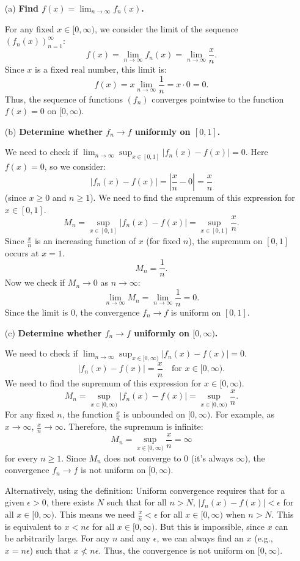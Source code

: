 \documentclass{article}
\begin{document}
\begin{enumerate}
  \item[(a)] \textbf{Find \(f(x) = \lim_{n\to\infty} f_n(x)\).}

    For any fixed \(x \in [0, \infty)\), we consider the limit of the sequence \((f_n(x))_{n=1}^\infty\):
    \[ f(x) = \lim_{n\to\infty} f_n(x) = \lim_{n\to\infty} \frac{x}{n}. \]
    Since \(x\) is a fixed real number, this limit is:
    \[ f(x) = x \lim_{n\to\infty} \frac{1}{n} = x \cdot 0 = 0. \]
    Thus, the sequence of functions \((f_n)\) converges pointwise to the function \(f(x) = 0\) on \([0, \infty)\).

  \item[(b)] \textbf{Determine whether \(f_n \to f\) uniformly on \([0, 1]\).}

    We need to check if \(\lim_{n\to\infty} \sup_{x \in [0,1]} |f_n(x) - f(x)| = 0\).
    Here \(f(x) = 0\), so we consider:
    \[ |f_n(x) - f(x)| = \left| \frac{x}{n} - 0 \right| = \frac{x}{n} \]
    (since \(x \ge 0\) and \(n \ge 1\)).
    We need to find the supremum of this expression for \(x \in [0, 1]\).
    \[ M_n = \sup_{x \in [0,1]} |f_n(x) - f(x)| = \sup_{x \in [0,1]} \frac{x}{n}. \]
    Since \(\frac{x}{n}\) is an increasing function of \(x\) (for fixed \(n\)), the supremum on \([0, 1]\) occurs at \(x = 1\).
    \[ M_n = \frac{1}{n}. \]
    Now we check if \(M_n \to 0\) as \(n \to \infty\):
    \[ \lim_{n\to\infty} M_n = \lim_{n\to\infty} \frac{1}{n} = 0. \]
    Since the limit is 0, the convergence \(f_n \to f\) is uniform on \([0, 1]\).

  \item[(c)] \textbf{Determine whether \(f_n \to f\) uniformly on \([0, \infty)\).}

    We need to check if \(\lim_{n\to\infty} \sup_{x \in [0,\infty)} |f_n(x) - f(x)| = 0\).
    \[ |f_n(x) - f(x)| = \frac{x}{n} \quad \text{for } x \in [0, \infty). \]
    We need to find the supremum of this expression for \(x \in [0, \infty)\).
    \[ M_n = \sup_{x \in [0,\infty)} |f_n(x) - f(x)| = \sup_{x \in [0,\infty)} \frac{x}{n}. \]
    For any fixed \(n\), the function \(\frac{x}{n}\) is unbounded on \([0, \infty)\). For example, as \(x \to \infty\), \(\frac{x}{n} \to \infty\).
    Therefore, the supremum is infinite:
    \[ M_n = \sup_{x \in [0,\infty)} \frac{x}{n} = \infty \]
    for every \(n \ge 1\).
    Since \(M_n\) does not converge to 0 (it's always \(\infty\)), the convergence \(f_n \to f\) is not uniform on \([0, \infty)\).

    Alternatively, using the definition: Uniform convergence requires that for a given \(\epsilon > 0\), there exists \(N\) such that for all \(n > N\), \(|f_n(x) - f(x)| < \epsilon\) for all \(x \in [0, \infty)\).
    This means we need \(\frac{x}{n} < \epsilon\) for all \(x \in [0, \infty)\) when \(n > N\).
    This is equivalent to \(x < n\epsilon\) for all \(x \in [0, \infty)\).
    But this is impossible, since \(x\) can be arbitrarily large. For any \(n\) and any \(\epsilon\), we can always find an \(x\) (e.g., \(x = n\epsilon\)) such that \(x \not< n\epsilon\).
    Thus, the convergence is not uniform on \([0, \infty)\).
\end{enumerate}
\end{document}
